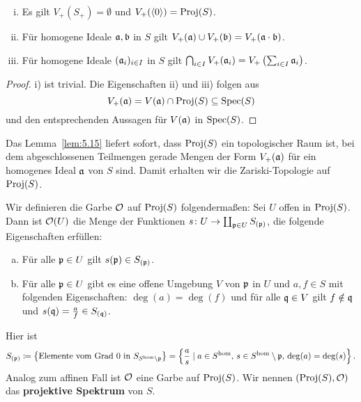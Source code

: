 \begin{lem}
\label{lem:5.15}
	\begin{enumerate}[i)]
		\item Es gilt $V_+(S_+) = \emptyset$ und $V_+(\langle 0 \rangle) = \operatorname{Proj}(S)$.
		\item Für homogene Ideale $\mathfrak{a},\mathfrak{b}$ in $S$ gilt $V_+(\mathfrak{a}) \cup V_+(\mathfrak{b}) = V_+(\mathfrak{a} \cdot \mathfrak{b})$.
		\item Für homogene Ideale $(\mathfrak{a}_i)_{i\in I}$ in $S$ gilt $\bigcap_{i\in I}V_+(\mathfrak{a}_i) = V_+\left(\sum_{i\in I}\mathfrak{a}_i\right)$.
	\end{enumerate}
	\begin{proof}
		i) ist trivial. Die Eigenschaften ii) und iii) folgen aus
		\[
			V_+(\mathfrak{a}) = V(\mathfrak{a}) \cap \operatorname{Proj}(S) \subseteq \operatorname{Spec}(S)
		\]
		und den entsprechenden Aussagen für $V(\mathfrak{a})$ in $\operatorname{Spec}(S)$.
	\end{proof}
\end{lem}

\begin{kons}
\label{kons:5.16}
	Das Lemma~\ref{lem:5.15} liefert sofort, dass $\operatorname{Proj}(S)$ ein topologischer Raum ist, bei dem abgeschlossenen Teilmengen gerade Mengen der Form $V_+(\mathfrak{a})$ für ein homogenes Ideal $\mathfrak{a}$ von $S$ sind. Damit erhalten wir die Zariski-Topologie auf $\operatorname{Proj}(S)$.

	Wir definieren die Garbe $\mathcal{O}$ auf $\operatorname{Proj}(S)$ folgendermaßen: Sei $U$ offen in $\operatorname{Proj}(S)$. Dann ist $\mathcal{O}(U)$ die Menge der Funktionen $s\colon U \to \coprod_{\mathfrak{p} \in U}S_{(\mathfrak{p})}$, die folgende Eigenschaften erfüllen:
	\begin{enumerate}[a)]
		\item Für alle $\mathfrak{p} \in U$ gilt $s(\mathfrak{p}) \in S_{(\mathfrak{p})}$.
		\item Für alle $\mathfrak{p} \in U$ gibt es eine offene Umgebung $V$ von $\mathfrak{p}$ in $U$ und $a,f\in S$ mit folgenden Eigenschaften:
                    $\deg(a)=\deg(f)$ und für alle $\mathfrak{q} \in V$ gilt $f \notin \mathfrak{q}$ und $s(\mathfrak{q}) =  \frac{a}{f} \in S_{(\mathfrak{q})}$.
	\end{enumerate}
	Hier ist
	\[
		S_{(\mathfrak{p})} \coloneqq \left\lbrace\text{Elemente vom Grad }0 \text{ in } S_{S^{\text{hom}}\setminus\mathfrak{p}} \right\rbrace = \left\lbrace \frac{a}{s} \mid a \in S^{\text{hom}},\, s \in S^{\text{hom}}\setminus \mathfrak{p},\, \deg(a) = \deg(s)\right\rbrace.
	\]
	Analog zum affinen Fall ist $\mathcal{O}$ eine Garbe auf $\operatorname{Proj}(S)$. Wir nennen $(\operatorname{Proj}(S),\mathcal{O})$ das \textbf{projektive Spektrum} von $S$.
\end{kons}

